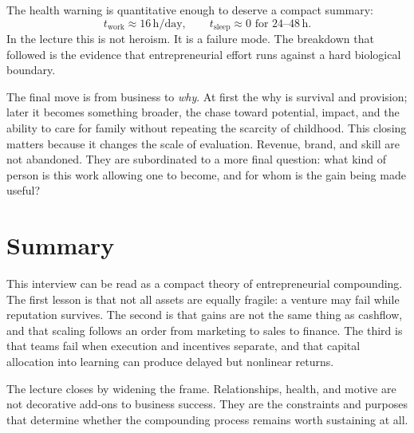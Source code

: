 The health warning is quantitative enough to deserve a compact summary:
\begin{equation}
t_{\text{work}} \approx 16\,\mathrm{h/day},
\qquad
t_{\text{sleep}} \approx 0
\text{ for } 24\text{--}48\,\mathrm{h}.
\end{equation}
In the lecture this is not heroism. It is a failure mode. The breakdown that followed is the evidence that entrepreneurial effort runs against a hard biological boundary.

The final move is from business to \emph{why}. At first the why is survival and provision; later it becomes something broader, the chase toward potential, impact, and the ability to care for family without repeating the scarcity of childhood. This closing matters because it changes the scale of evaluation. Revenue, brand, and skill are not abandoned. They are subordinated to a more final question: what kind of person is this work allowing one to become, and for whom is the gain being made useful?

\section{Summary}

This interview can be read as a compact theory of entrepreneurial compounding. The first lesson is that not all assets are equally fragile: a venture may fail while reputation survives. The second is that gains are not the same thing as cashflow, and that scaling follows an order from marketing to sales to finance. The third is that teams fail when execution and incentives separate, and that capital allocation into learning can produce delayed but nonlinear returns.

The lecture closes by widening the frame. Relationships, health, and motive are not decorative add-ons to business success. They are the constraints and purposes that determine whether the compounding process remains worth sustaining at all.